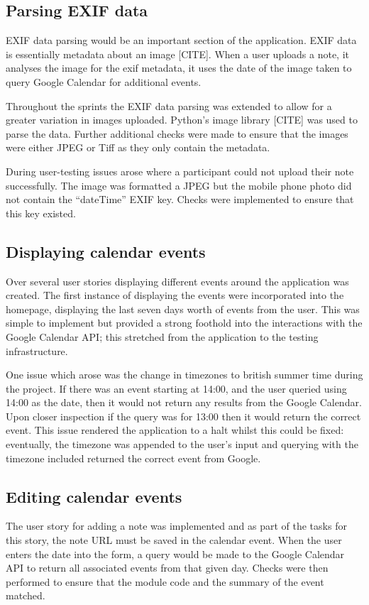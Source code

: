 {{{{{{\subsection{Parsing EXIF data}
EXIF data parsing would be an important section of the application. EXIF data is essentially metadata about an image [CITE]. When a user uploads a note, it analyses the image for the exif metadata, it uses the date of the image taken to query Google Calendar for additional events.

Throughout the sprints the EXIF data parsing was extended to allow for a greater variation in images uploaded. Python's image library [CITE] was used to parse the data. Further additional checks were made to ensure that the images were either JPEG or Tiff as they only contain the metadata.

During user-testing issues arose where a participant could not upload their note successfully. The image was formatted a JPEG but the mobile phone photo did not contain the ``dateTime'' EXIF key. Checks were implemented to ensure that this key existed.

\subsection{Displaying calendar events}
Over several user stories displaying different events around the application was created. The first instance of displaying the events were incorporated into the homepage, displaying the last seven days worth of events from the user. This was simple to implement but provided a strong foothold into the interactions with the Google Calendar API; this stretched from the application to the testing infrastructure.

One issue which arose was the change in timezones to british summer time during the project. If there was an event starting at 14:00, and the user queried using  14:00 as the date, then it would not return any results from the Google Calendar. Upon closer inspection if the query was for 13:00 then it would return the correct event. This issue rendered the application to a halt whilst this could be fixed: eventually, the timezone was appended to the user's input and querying with the timezone included returned the correct event from Google.

\subsection{Editing calendar events}
The user story for adding a note was implemented and as part of the tasks for this story, the note URL must be saved in the calendar event. When the user enters the date into the form, a query would be made to the Google Calendar API to return all associated events from that given day. Checks were then performed to ensure that the module code and the summary of the event matched.

}}}}}}
